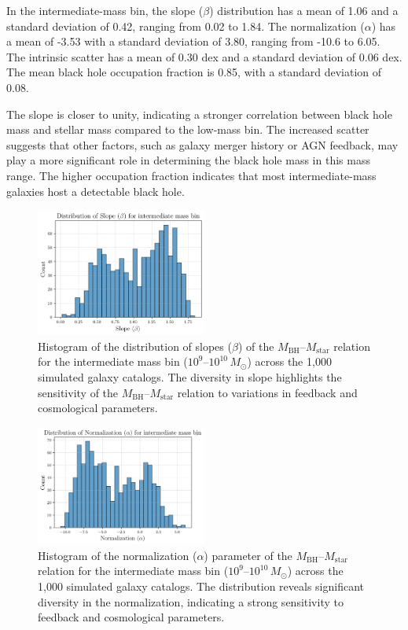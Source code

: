 \documentclass[twocolumn]{aastex631}
\begin{document}
In the intermediate-mass bin, the slope ($\beta$) distribution has a mean of 1.06 and a standard deviation of 0.42, ranging from 0.02 to 1.84. The normalization ($\alpha$) has a mean of -3.53 with a standard deviation of 3.80, ranging from -10.6 to 6.05. The intrinsic scatter has a mean of 0.30 dex and a standard deviation of 0.06 dex. The mean black hole occupation fraction is 0.85, with a standard deviation of 0.08.

The slope is closer to unity, indicating a stronger correlation between black hole mass and stellar mass compared to the low-mass bin. The increased scatter suggests that other factors, such as galaxy merger history or AGN feedback, may play a more significant role in determining the black hole mass in this mass range. The higher occupation fraction indicates that most intermediate-mass galaxies host a detectable black hole.

\begin{figure}[ht!]
    \centering
    \includegraphics[width=0.5\textwidth]{../Project5/plots/dist_beta_intermediate_42_20250423_182544.png}
    \caption{Histogram of the distribution of slopes ($\beta$) of the $M_\mathrm{BH}$–$M_\mathrm{star}$ relation for the intermediate mass bin ($10^9$–$10^{10}\,M_\odot$) across the 1,000 simulated galaxy catalogs. The diversity in slope highlights the sensitivity of the $M_\mathrm{BH}$–$M_\mathrm{star}$ relation to variations in feedback and cosmological parameters.
}
    \label{fig:dist_beta_intermediate}
\end{figure}

\begin{figure}[ht!]
    \centering
    \includegraphics[width=0.5\textwidth]{../Project5/plots/dist_alpha_intermediate_43_20250423_182545.png}
    \caption{Histogram of the normalization ($\alpha$) parameter of the $M_\mathrm{BH}$–$M_\mathrm{star}$ relation for the intermediate mass bin ($10^9$–$10^{10}\,M_\odot$) across the 1,000 simulated galaxy catalogs. The distribution reveals significant diversity in the normalization, indicating a strong sensitivity to feedback and cosmological parameters.
}
    \label{fig:dist_alpha_intermediate}
\end{figure}
\end{document}
